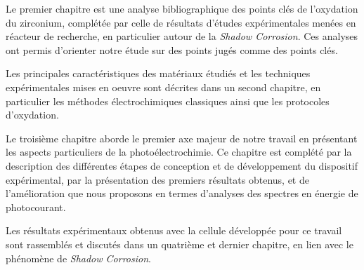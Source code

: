 Le premier chapitre est une analyse bibliographique des points clés de l'oxydation du zirconium, complétée par celle de
résultats d'études expérimentales menées en réacteur de recherche, en particulier autour de la \emph{Shadow Corrosion}. 
Ces analyses ont permis d'orienter notre étude sur des points jugés comme des points clés.

Les principales caractéristiques des matériaux étudiés et les techniques 
expérimentales mises en oeuvre sont décrites dans un second chapitre, en particulier les méthodes électrochimiques classiques
 ainsi que les protocoles d'oxydation.

Le troisième chapitre aborde le premier axe majeur de notre travail en présentant les aspects particuliers de la photoélectrochimie. 
Ce chapitre est complété par
la description des différentes étapes de conception et de développement du dispositif expérimental, 
par la présentation des premiers résultats obtenus, et de l'amélioration que nous proposons en termes d'analyses des 
spectres en énergie de photocourant.

Les résultats expérimentaux obtenus avec la cellule développée pour ce travail sont rassemblés et discutés 
dans un quatrième et dernier chapitre, en lien avec le phénomène de \emph{Shadow Corrosion}.




